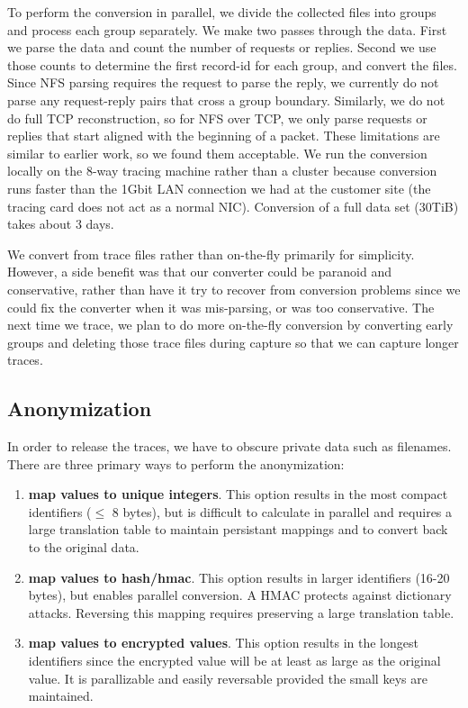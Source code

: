 To perform the conversion in parallel, we divide the collected files
into groups and process each group separately.  We make two passes
through the data.  First we parse the data and count the number of
requests or replies.  Second we use those counts to determine the
first record-id for each group, and convert the files.  Since NFS
parsing requires the request to parse the reply, we currently do not
parse any request-reply pairs that cross a group boundary.  Similarly,
we do not do full TCP reconstruction, so for NFS over TCP, we only
parse requests or replies that start aligned with the beginning of a
packet. These limitations are similar to earlier work, so we found
them acceptable.   We run the conversion locally on the 8-way tracing
machine rather than a cluster because conversion runs faster than the
1Gbit LAN connection we had at the customer site (the tracing card
does not act as a normal NIC).  Conversion of a full data set (30TiB)
takes about 3 days.

We convert from trace files rather than on-the-fly primarily for
simplicity.  However, a side benefit was that our converter could be
paranoid and conservative, rather than have it try to recover from
conversion problems since we could fix the converter when it was
mis-parsing, or was too conservative.  The next time we trace, we plan
to do more on-the-fly conversion by converting early groups and
deleting those trace files during capture so that we can capture
longer traces.

\subsection{Anonymization}

In order to release the traces, we have to obscure private data such
as filenames.  There are three primary ways to perform the anonymization: 

\begin{enumerate}

\item {\bf map values to unique integers}.  This option results in the
most compact identifiers ($\leq$ 8 bytes), but is difficult to
calculate in parallel and requires a large translation table to
maintain persistant mappings and to convert back to the original data.

\item {\bf map values to hash/hmac}.  This option results in larger
identifiers (16-20 bytes), but enables parallel conversion.  A HMAC
protects against dictionary attacks.  Reversing this mapping requires
preserving a large translation table.

\item {\bf map values to encrypted values}.  This option results in
the longest identifiers since the encrypted value will be at least as
large as the original value.  It is parallizable and easily reversable
provided the small keys are maintained.

\end{enumerate}

